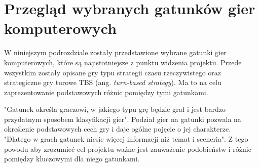 \section{Przegląd wybranych gatunków gier komputerowych}
W niniejszym podrozdziale zostały przedstawione wybrane gatunki gier komputerowych, które są najistotniejsze z punktu widzenia
projektu. Przede wszystkim zostały opisane gry typu strategii czasu rzeczywistego oraz strategiczne gry turowe TBS (ang.
\textit{turn-based strategy}). Ma to na celu zaprezentowanie podstawowych różnic pomiędzy tymi gatunkami.

"Gatunek określa graczowi, w jakiego typu grę będzie grał i jest bardzo przydatnym sposobem klasyfikacji gier"\cite{practical_game_design}.
Podział gier na gatunki pozwala na określenie podstawowych cech gry i daje ogólne pojęcie o jej charakterze. "Dlatego w
grach gatunek niesie więcej informacji niż temat i sceneria"\cite{practical_game_design}. Z tego powodu aby zrozumieć cel projektu ważne jest zauważenie podobieństw i różnic pomiędzy kluczowymi dla niego gatunkami.





